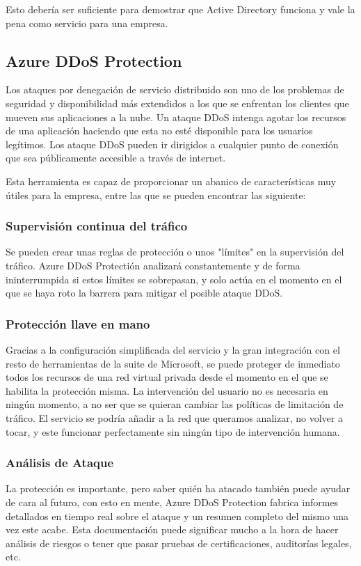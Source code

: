 \documentclass[english,runningheads,a4paper]{llncs}[2018/03/10]
\begin{document}
Esto debería ser suficiente para demostrar que Active Directory funciona y vale
la pena como servicio para una empresa. 

\subsection*{Azure DDoS Protection}
Los ataques por denegación de servicio distribuido son uno de los problemas de
seguridad y disponibilidad más extendidos a los que se enfrentan los clientes
que mueven sus aplicaciones a la nube. Un ataque DDoS intenga agotar los
recursos de una aplicación haciendo que esta no esté disponible para los
usuarios legítimos. Los ataque DDoS pueden ir dirigidos a cualquier punto de
conexión que sea públicamente accesible a través de internet.

Esta herramienta es capaz de proporcionar un abanico de características muy
útiles para la empresa, entre las que se pueden encontrar las siguiente:

\subsubsection*{Supervisión continua del tráfico}
Se pueden crear unas reglas de protección o unos "límites" en la supervisión del
tráfico. Azure DDoS Protectión analizará constantemente y de forma
ininterrumpida si estos límites se sobrepasan, y solo actúa en el momento en el
que se haya roto la barrera para mitigar el posible ataque DDoS.
    
\subsubsection*{Protección llave en mano}
Gracias a la configuración simplificada del servicio y la gran integración con
el resto de herramientas de la suite de Microsoft, se puede proteger de
inmediato todos los recursos de una red virtual privada desde el momento en el
que se habilita la protección misma. La intervención del usuario no es necesaria
en ningún momento, a no ser que se quieran cambiar las políticas de limitación
de tráfico. El servicio se podría añadir a la red que queramos analizar, no
volver a tocar, y este funcionar perfectamente sin ningún tipo de intervención
humana.

\subsubsection*{Análisis de Ataque}
La protección es importante, pero saber quién ha atacado también puede ayudar de
cara al futuro, con esto en mente, Azure DDoS Protection fabrica informes
detallados en tiempo real sobre el ataque y un resumen completo del mismo una
vez este acabe. Esta documentación puede significar mucho a la hora de hacer
análisis de riesgos o tener que pasar pruebas de certificaciones, auditorías
legales, etc.\
\end{document}
